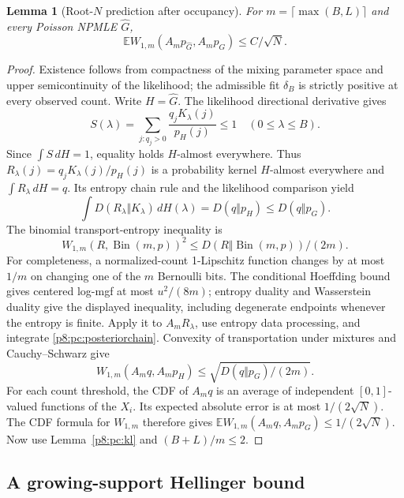 \documentclass[11pt,a4paper]{article}
\newtheorem{lemma}[theorem]{Lemma}
\theoremstyle{definition}
\theoremstyle{remark}
\numberwithin{equation}{section}
\begin{document}
\begin{lemma}[Root-$N$ prediction after occupancy]\label{p8:pc:transport}
For $m=\lceil\max(B,L)\rceil$ and every Poisson NPMLE $\widehat G$,
\begin{equation}\label{p8:pc:transportbound}
       \mathbb E W_{1,m}(A_mp_{\widehat G},A_mp_G)\le C/\sqrt N.
\end{equation}
\end{lemma}
\begin{proof}
Existence follows from compactness of the mixing parameter space
and upper semicontinuity of the likelihood; the admissible fit
$\delta_B$ is strictly positive at every observed count.  Write
$H=\widehat G$.  The likelihood directional derivative gives
\[
 S(\lambda)=\sum_{j:q_j>0}\frac{q_jK_\lambda(j)}{p_H(j)}\le1
                    \quad(0\le\lambda\le B).
\]
Since $\int S\,dH=1$, equality holds $H$-almost everywhere.
Thus $R_\lambda(j)=q_jK_\lambda(j)/p_H(j)$ is a probability kernel
$H$-almost everywhere and $\int R_\lambda\,dH=q$.  Its entropy
chain rule and the likelihood comparison yield
\begin{equation}\label{p8:pc:posteriorchain}
 \int D(R_\lambda\Vert K_\lambda)\,dH(\lambda)
       =D(q\Vert p_H)\le D(q\Vert p_G).
\end{equation}
The binomial transport-entropy inequality is
\[
 W_{1,m}(R,\operatorname{Bin}(m,p))^2
          \le D(R\Vert\operatorname{Bin}(m,p))/(2m).
\]
For completeness, a normalized-count 1-Lipschitz function changes
by at most $1/m$ on changing one of the $m$ Bernoulli bits.
The conditional Hoeffding bound gives centered log-mgf at most
$u^2/(8m)$; entropy duality and Wasserstein duality give the
displayed inequality, including degenerate endpoints whenever the
entropy is finite.  Apply it to $A_mR_\lambda$, use entropy data
processing, and integrate \eqref{p8:pc:posteriorchain}.  Convexity of
transportation under mixtures and Cauchy--Schwarz give
\[
 W_{1,m}(A_mq,A_mp_H)
                  \le\sqrt{D(q\Vert p_G)/(2m)}.
\]
For each count threshold, the CDF of $A_mq$ is an average of
independent $[0,1]$-valued functions of the $X_i$.  Its expected
absolute error is at most $1/(2\sqrt N)$.  The CDF formula for
$W_{1,m}$ therefore gives
$\mathbb E W_{1,m}(A_mq,A_mp_G)\le1/(2\sqrt N)$.
Now use Lemma~\ref{p8:pc:kl} and $(B+L)/m\le2$.
\end{proof}

\subsection{A growing-support Hellinger bound}
\end{document}
